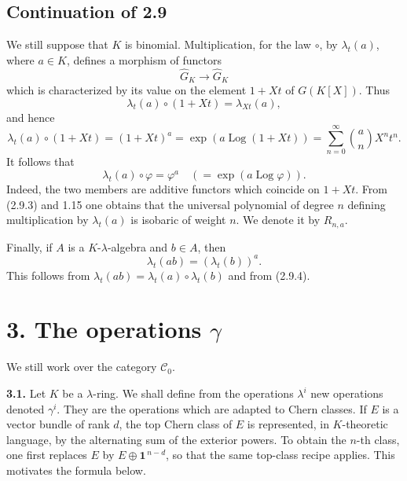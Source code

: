 \providecommand{\Ghat}{\widehat G}
\providecommand{\Gg}{\widehat G_g}
\providecommand{\Gcirc}{\widehat G_{\circ}}
\providecommand{\Gnabla}{\widehat G_{\nabla}}
\providecommand{\Grhat}{\widehat{\operatorname{Gr}}}
\providecommand{\Log}{\operatorname{Log}}
\providecommand{\Fil}{\operatorname{Fil}}
\providecommand{\eps}{\varepsilon}
\providecommand{\id}{\operatorname{id}}
\providecommand{\Sym}{\operatorname{Sym}}
\providecommand{\Mon}{\operatorname{Mon}}


\subsection*{Continuation of 2.9}

We still suppose that \(K\) is binomial. Multiplication, for the law \(\circ\), by \(\lambda_t(a)\), where \(a\in K\), defines a morphism of functors
\[
  \Ghat_K\longrightarrow \Ghat_K
\]
which is characterized by its value on the element \(1+Xt\) of \(G(K[X])\). Thus
\[
  \lambda_t(a)\circ(1+Xt)=\lambda_{Xt}(a),
\]
and hence
\begin{equation}\tag{2.9.3}
  \lambda_t(a)\circ(1+Xt)
  =(1+Xt)^a
  =\exp(a\Log(1+Xt))
  =\sum_{n=0}^{\infty}\binom{a}{n}X^nt^n .
\end{equation}
It follows that
\begin{equation}\tag{2.9.4}
  \lambda_t(a)\circ\varphi=\varphi^a
  \quad(=\exp(a\Log\varphi)).
\end{equation}
Indeed, the two members are additive functors which coincide on \(1+Xt\). From (2.9.3) and 1.15 one obtains that the universal polynomial of degree \(n\) defining multiplication by \(\lambda_t(a)\) is isobaric of weight \(n\). We denote it by \(R_{n,a}\).

Finally, if \(A\) is a \(K\)-\(\lambda\)-algebra and \(b\in A\), then
\begin{equation}\tag{2.9.5}
  \lambda_t(ab)=(\lambda_t(b))^a .
\end{equation}
This follows from \(\lambda_t(ab)=\lambda_t(a)\circ\lambda_t(b)\) and from (2.9.4).

\section*{3. The operations \(\gamma\)}

We still work over the category \(\mathscr C_0\).

\textbf{3.1.} Let \(K\) be a \(\lambda\)-ring. We shall define from the operations \(\lambda^i\) new operations denoted \(\gamma^i\). They are the operations which are adapted to Chern classes. If \(E\) is a vector bundle of rank \(d\), the top Chern class of \(E\) is represented, in \(K\)-theoretic language, by the alternating sum of the exterior powers. To obtain the \(n\)-th class, one first replaces \(E\) by \(E\oplus\mathbf1^{\,n-d}\), so that the same top-class recipe applies. This motivates the formula below.

